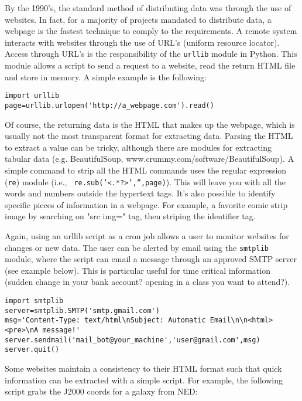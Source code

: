 \documentclass[11pt,preprint,graphicx]{aastex}
\begin{document}
\noindent By the 1990's, the standard method of distributing data was
through the use of websites.  In fact, for a majority of projects mandated
to distribute data, a webpage is the fastest technique to comply to the
requirements.  A remote system interacts with websites through the use of
URL's (uniform resource locator). Access through URL's is the
responsibility of the {\tt urllib} module in Python.  This module allows a
script to send a request to a website, read the return HTML file and store
in memory.  A simple example is the following:

\begin{verbatim}
import urllib
page=urllib.urlopen('http://a_webpage.com').read()
\end{verbatim}

\noindent Of course, the returning data is the HTML that makes up the
webpage, which is usually not the most transparent format for extracting
data.  Parsing the HTML to extract a value can be tricky, although there
are modules for extracting tabular data (e.g. BeautifulSoup,
www.crummy.com/software/BeautifulSoup).  A simple command to strip all the
HTML commands uses the regular expression ({\tt re}) module (i.e., {\tt
re.sub('<.*?>','',page)}).  This will leave you with all the words and
numbers outside the hypertext tags.  It's also possible to identify
specific pieces of information in a webpage.  For example, a favorite comic
strip image by searching on "src img=" tag, then striping the identifier
tag.

\noindent Again, using an urllib script as a cron job allows a user to monitor
websites for changes or new data.  The user can be alerted by email using
the {\tt smtplib} module, where the script can email a message through an
approved SMTP server (see example below).  This is particular useful for time critical
information (sudden change in your bank account? opening in a class you
want to attend?).

\begin{verbatim}
import smtplib
server=smtplib.SMTP('smtp.gmail.com')
msg='Content-Type: text/html\nSubject: Automatic Email\n\n<html><pre>\nA message!'
server.sendmail('mail_bot@your_machine','user@gmail.com',msg)
server.quit()
\end{verbatim}

\noindent Some websites maintain a consistency to their HTML format such
that quick information can be extracted with a simple script.  For example,
the following script grabs the J2000 coords for a galaxy from NED:
\end{document}
